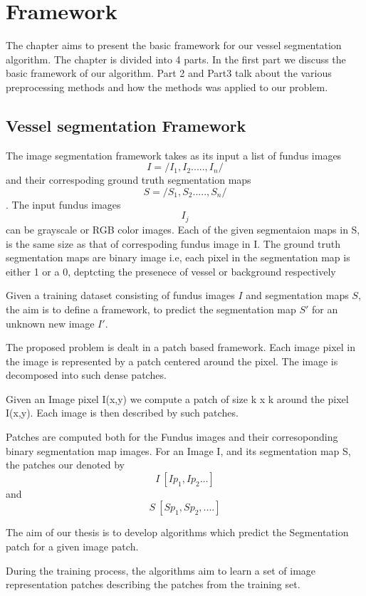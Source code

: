 \chapter{Framework}

\ifpdf
    \graphicspath{{Chapter3/Figs/Raster/}{Chapter3/Figs/PDF/}{Chapter3/Figs/}}
\else
    \graphicspath{{Chapter3/Figs/Vector/}{Chapter3/Figs/}}
\fi
The chapter aims to present the basic framework for our vessel segmentation algorithm.
The chapter is divided into 4 parts. In the first part we discuss the basic framework of our algorithm. Part 2 and Part3 talk about the various preprocessing methods and how the methods was applied to our problem.
\section{Vessel segmentation Framework}
The image segmentation framework takes as its input a list of fundus images  $$I = /{I_1, I_2....., I_n /}$$  and their correspoding ground truth segmentation maps  $$S = /{S_1, S_2....., S_n/} $$. The input fundus images $$I_j$$ can be grayscale or RGB color images. Each of the given segmentaion maps in S, is the same size as that of correspoding fundus image in I. The ground truth segmentation maps are binary image i.e, each pixel in the segmentation map is either 1 or a 0, deptcting the presenece of vessel or background respectively

Given a training dataset consisting of fundus images $ I $ and segmentation maps $ S $, the aim is to define a framework, to predict the segmentation map $S'$ for an unknown new image $I'$.

The proposed problem is dealt in a patch based framework. Each image pixel in the image is represented by a patch centered around the pixel. The image is decomposed into such dense patches.

Given an Image pixel I(x,y) we compute a patch of size k x k around the pixel I(x,y). Each image is then described by such patches.

Patches are computed both for the Fundus images and their corresoponding binary segmentation map images. For an Image I, and its segmentation map S, the patches our denoted by 
$$I ~ [Ip_1,Ip_2 …] $$ and $$S ~ [Sp_1,Sp_2,....] $$

The aim of our thesis is to develop algorithms which predict the Segmentation patch for a given image patch.

During the training process, the algorithms aim to learn a set of image representation patches describing the patches from the training set.

